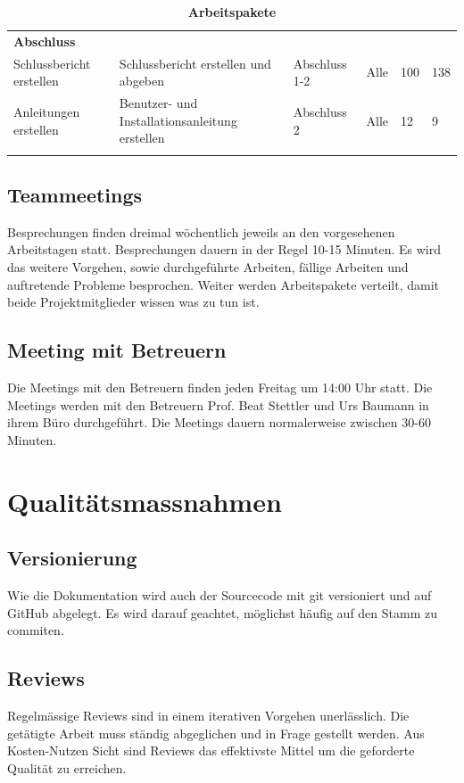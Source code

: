 \begin{landscape}
\begin{longtable}{ p{5.5cm} p{8cm} l l p{1cm} p{1cm} }
\textbf{Abschluss}&&&&\\ \addlinespace
Schlussbericht erstellen & Schlussbericht erstellen und abgeben & Abschluss 1-2 & Alle & 100 & 138\\ \addlinespace
Anleitungen erstellen & Benutzer- und Installationsanleitung erstellen & Abschluss 2 & Alle & 12 & 9\\ \addlinespace


\addlinespace


\hline\caption{\textbf{Arbeitspakete}}
\end{longtable}
\end{landscape}

\subsection{Teammeetings}
Besprechungen finden dreimal wöchentlich jeweils an den vorgesehenen Arbeitstagen statt. 
Besprechungen dauern in der Regel 10-15 Minuten. Es wird das weitere Vorgehen, sowie durchgeführte Arbeiten, fällige Arbeiten und auftretende Probleme besprochen. Weiter werden Arbeitspakete verteilt, damit beide Projektmitglieder wissen was zu tun ist. 

\subsection{Meeting mit Betreuern}
Die Meetings mit den Betreuern finden jeden Freitag um 14:00 Uhr statt. 
Die Meetings werden mit den Betreuern Prof. Beat Stettler und Urs Baumann in ihrem Büro durchgeführt. Die Meetings dauern normalerweise zwischen 30-60 Minuten. 

\section{Qualitätsmassnahmen}
\subsection{Versionierung}
Wie die Dokumentation wird auch der Sourcecode mit git versioniert und auf GitHub abgelegt. Es wird darauf geachtet, möglichst häufig auf den Stamm zu commiten.
\subsection{Reviews}
Regelmässige Reviews sind in einem iterativen Vorgehen unerlässlich. Die getätigte Arbeit muss ständig abgeglichen und in Frage gestellt werden. Aus Kosten-Nutzen Sicht sind Reviews das effektivste Mittel um die geforderte Qualität zu erreichen.\\ 

